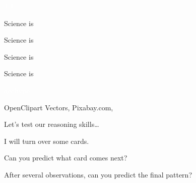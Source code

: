 \documentclass[t]{beamer}
\begin{document}
{
\begin{frame}[b]

	\hfill \tiny\textcolor{white}{J.J, }
\end{frame}
}


{
\begin{frame}[b]{Science is }
\end{frame}
}


{
\begin{frame}[b]{Science is }
\end{frame}
}

{
\begin{frame}[b]{Science is }
\end{frame}
}

{
\begin{frame}[b]{Science is }
\end{frame}
}

{
\begin{frame}[b]

\hfill \tiny \textcolor{white}{decltype, }
\end{frame}
}

{
\begin{frame}[b,plain]

\hfill\tiny OpenClipart Vectors, Pixabay.com, 
\end{frame}
}

\begin{frame}{Let's test our reasoning skills\dots}

	\hangpara I will turn over some cards.
	
	\hangpara Can you predict what card comes next?
	
	\hangpara After several observations, can you predict the final pattern?

\end{frame}
\end{document}
